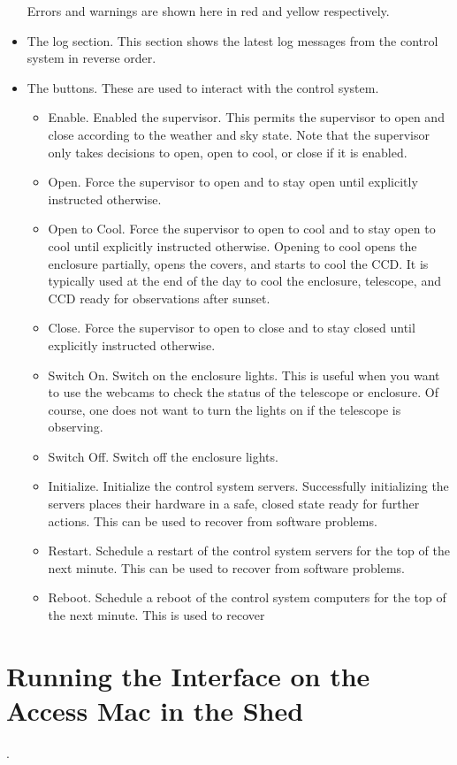 \begin{itemize}
Errors and warnings are shown here in red and yellow respectively.
\item
The log section. This section shows the latest log messages from the control system in reverse order.
\item
The buttons. These are used to interact with the control system.
\begin{itemize}
\item
Enable. Enabled the supervisor. This permits the supervisor to open and close according to the weather and sky state. Note that the supervisor only takes decisions to open, open to cool, or close if it is enabled. 
\item
Open. Force the supervisor to open and to stay open until explicitly instructed otherwise.
\item
Open to Cool. Force the supervisor to open to cool and to stay open to cool until explicitly instructed otherwise. Opening to cool opens the enclosure partially, opens the covers, and starts to cool the CCD. It is typically used at the end of the day to cool the enclosure, telescope, and CCD ready for observations after sunset.
\item
Close. Force the supervisor to open to close and to stay closed until explicitly instructed otherwise.
\label{interface-close-button}
\item
Switch On. Switch on the enclosure lights. This is useful when you want to use the webcams to check the status of the telescope or enclosure. Of course, one does not want to turn the lights on if the telescope is observing.
\label{interface-switch-on-button}
\item
Switch Off. Switch off the enclosure lights. 
\label{interface-switch-off-button}
\item
Initialize. Initialize the control system servers. Successfully initializing the servers places their hardware in a safe, closed state ready for further actions. This can be used to recover from software problems.
\label{interface-initialize-button}
\item
Restart. Schedule a restart of the control system servers for the top of the next minute. This can be used to recover from software problems.
\label{interface-restart-button}
\item
Reboot. Schedule a reboot of the control system computers for the top of the next minute. This is used to recover 
\end{itemize}
\end{itemize}

\section{Running the Interface on the Access Mac in the Shed}
\label{section:interface-access-mac}.

